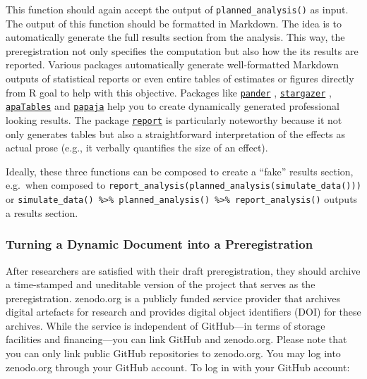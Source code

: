 \documentclass[psych,tutorial,submit,moreauthors,pdftex]{mdpi}
\begin{document}
This function should again accept the output of
\texttt{planned\_analysis()} as input. The output of this function
should be formatted in Markdown. The idea is to automatically generate
the full results section from the analysis. This way, the
preregistration not only specifies the computation but also how the its
results are reported. Various packages automatically generate
well-formatted Markdown outputs of statistical reports or even entire
tables of estimates or figures directly from R goal to help with this
objective. Packages like
\href{https://github.com/Rapporter/pander}{\texttt{pander}}
\citep{pander},
\href{https://cran.r-project.org/web/packages/stargazer/vignettes/stargazer.pdf}{\texttt{stargazer}}
\citep{stargazer},
\href{https://dstanley4.github.io/apaTables/articles/apaTables.html}{\texttt{apaTables}}
\citep{apaTables} and
\href{http://frederikaust.com/papaja_man/}{\texttt{papaja}}
\citep{papaja} help you to create dynamically generated professional
looking results. The package
\href{https://github.com/easystats/report}{\texttt{report}}
\citep{report} is particularly noteworthy because it not only generates
tables but also a straightforward interpretation of the effects as
actual prose (e.g., it verbally quantifies the size of an effect).

Ideally, these three functions can be composed to create a ``fake''
results section, e.g.~when composed to
\texttt{report\_analysis(planned\_analysis(simulate\_data()))} or
\texttt{simulate\_data()\ \%\textgreater{}\%\ planned\_analysis()\ \%\textgreater{}\%\ report\_analysis()}
outputs a results section.

\hypertarget{turning-a-dynamic-document-into-a-preregistration}{%
\subsubsection{Turning a Dynamic Document into a
Preregistration}\label{turning-a-dynamic-document-into-a-preregistration}}

After researchers are satisfied with their draft preregistration, they
should archive a time-stamped and uneditable version of the project that
serves as the preregistration. zenodo.org \citep{zenodo} is a publicly
funded service provider that archives digital artefacts for research and
provides digital object identifiers (DOI) for these archives. While the
service is independent of GitHub---in terms of storage facilities and
financing---you can link GitHub and zenodo.org. Please note that you can
only link public GitHub repositories to zenodo.org. You may log into
zenodo.org through your GitHub account. To log in with your GitHub
account:
\end{document}
